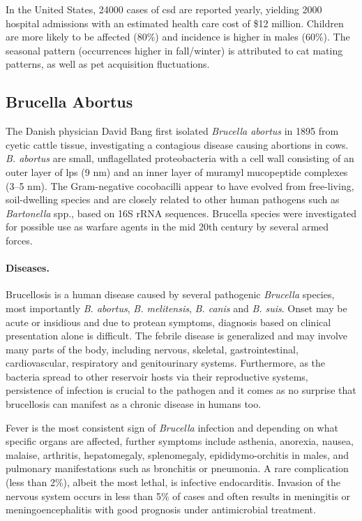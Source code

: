 In the United States, 24000 cases of \gls{csd} are reported yearly, yielding 2000 hospital admissions with an estimated health care cost of \$12 million. Children are more likely to be affected (80\%) and incidence is higher in males (60\%). The seasonal pattern (occurrences higher in fall/winter) is attributed to cat mating patterns, as well as pet acquisition fluctuations.

\subsection{Brucella Abortus}


The Danish physician David Bang first isolated \textit{Brucella abortus} in 1895 from cyetic cattle tissue, investigating a contagious disease causing abortions in cows. \textit{B. abortus} are small, unflagellated proteobacteria with a cell wall consisting of an outer layer of \gls{lps} (9 nm) and an inner layer of muramyl mucopeptide complexes (3--5 nm). The Gram-negative cocobacilli appear to have evolved from free-living, soil-dwelling species and are closely related to other human pathogens such as \textit{Bartonella} spp., based on 16S rRNA sequences. Brucella species were investigated for possible use as warfare agents in the mid 20th century by several armed forces. \citep{Atluri2011}

\paragraph{Diseases.}
Brucellosis is a human disease caused by several pathogenic \textit{Brucella} species, most importantly \textit{B. abortus}, \textit{B. melitensis}, \textit{B. canis} and \textit{B. suis}. Onset may be acute or insidious and due to protean symptoms, diagnosis based on clinical presentation alone is difficult. The febrile disease is generalized and may involve many parts of the body, including nervous, skeletal, gastrointestinal, cardiovascular, respiratory and genitourinary systems. Furthermore, as the bacteria spread to other reservoir hosts via their reproductive systems, persistence of infection is crucial to the pathogen and it comes as no surprise that brucellosis can manifest as a chronic disease in humans too.

Fever is the most consistent sign of \textit{Brucella} infection and depending on what specific organs are affected, further symptoms include asthenia, anorexia, nausea, malaise, arthritis, hepatomegaly, splenomegaly, epididymo-orchitis in males, and pulmonary manifestations such as bronchitis or pneumonia. A rare complication (less than 2\%), albeit the most lethal, is infective endocarditis. Invasion of the nervous system occurs in less than 5\% of cases and often results in meningitis or meningoencephalitis with good prognosis under antimicrobial treatment.

